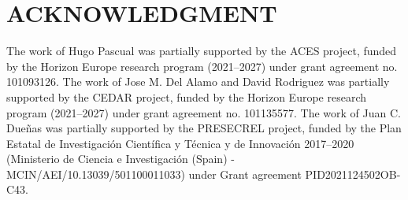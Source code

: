 \documentclass{article}
\begin{document}
\section{ACKNOWLEDGMENT}

The work of Hugo Pascual was partially supported by the ACES project, funded by the Horizon Europe research program (2021–2027) under grant agreement no. 101093126. The work of Jose M. Del Alamo and David Rodriguez was partially supported by the CEDAR project, funded by the Horizon Europe research program (2021–2027) under grant agreement no. 101135577. The work of Juan C. Dueñas was partially supported by the PRESECREL project, funded by the Plan Estatal de Investigación Científica y Técnica y de Innovación 2017–2020 (Ministerio de Ciencia e Investigación (Spain) - MCIN/AEI/10.13039/501100011033) under Grant agreement PID2021124502OB-C43.

% 
% 
\printbibliography
\end{document}
